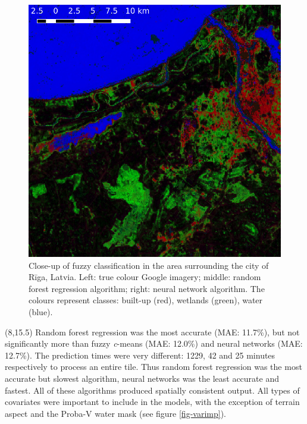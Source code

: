\documentclass[20pt]{beamer}
\begin{document}
\begin{frame}{}
\begin{textblock}{7}
\begin{figure}
		  \includegraphics[width=2.3\TPHorizModule]{../thesis/thesis-figures/figures-qgis/riga-nn}
		  \caption{Close-up of fuzzy classification in the area surrounding the city of Rīga, Latvia. Left: true colour Google imagery; middle: random forest regression algorithm; right: neural network algorithm. The colours represent classes: built-up (red), wetlands (green), water (blue).}
		\end{figure}



	\end{textblock}
	
	\begin{textblock}{7}(8,15.5)
		\Line
		Random forest regression was the most accurate (MAE: 11.7\%), but not significantly more than fuzzy \textit{c}-means (MAE: 12.0\%) and neural networks (MAE: 12.7\%). The prediction times were very different: 1229, 42 and 25 minutes respectively to process an entire tile. Thus random forest regression was the most accurate but slowest algorithm, neural networks was the least accurate and fastest. All of these algorithms produced spatially consistent output. All types of covariates were important to include in the models, with the exception of terrain aspect and the Proba-V water mask (see figure \ref{fig-varimp}).
		

\end{textblock}
\end{frame}
\end{document}
